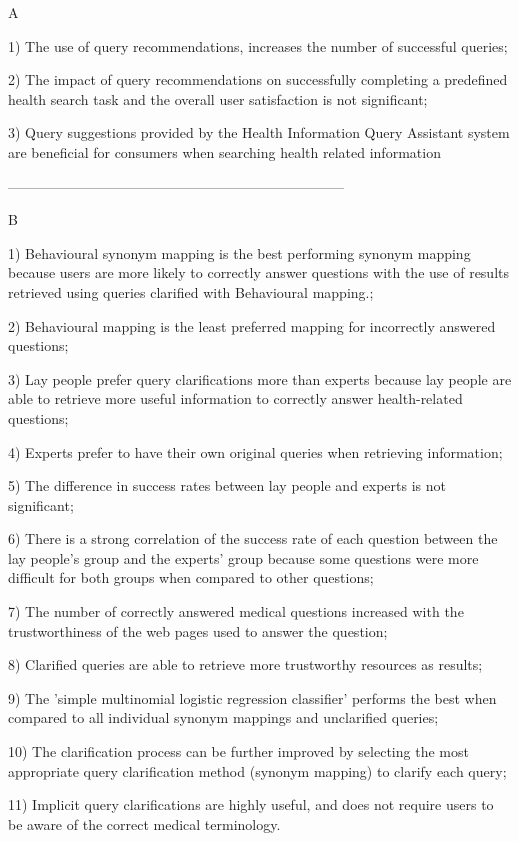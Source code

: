 

A

1) The use of query recommendations, increases the number of successful queries; 

2) The impact of query recommendations on successfully completing a predefined health search task and the overall user satisfaction is not significant; 

3) Query suggestions provided by the Health Information Query Assistant system are beneficial for consumers when searching health related information 


------------------------------------------------------------------------

B

1) Behavioural synonym mapping is the best performing synonym mapping because users are more likely to correctly answer questions with the use of results retrieved using queries clarified with Behavioural mapping.; 

2) Behavioural mapping is the least preferred mapping for incorrectly answered questions;

3) Lay people prefer query clarifications more than experts because lay people are able to retrieve  more useful information to correctly answer health-related questions; 

4) Experts prefer to have their own original queries when retrieving information; 

5) The difference in success rates between lay people and experts is not significant; 

6) There is a strong correlation of the success rate of each question between the lay people's group and the experts' group because some questions were more difficult for both groups when compared to other questions; 

7) The number of correctly answered medical questions increased with the trustworthiness of the web pages used to answer the question; 

8) Clarified queries are able to retrieve more trustworthy resources as results; 

9) The 'simple multinomial logistic regression classifier' performs the best when compared to all individual synonym mappings and unclarified queries; 

10) The clarification process can be further improved by selecting the most appropriate query clarification method (synonym mapping) to clarify each query; 

11) Implicit query clarifications are highly useful, and does not require users to be aware of the correct medical terminology.       


